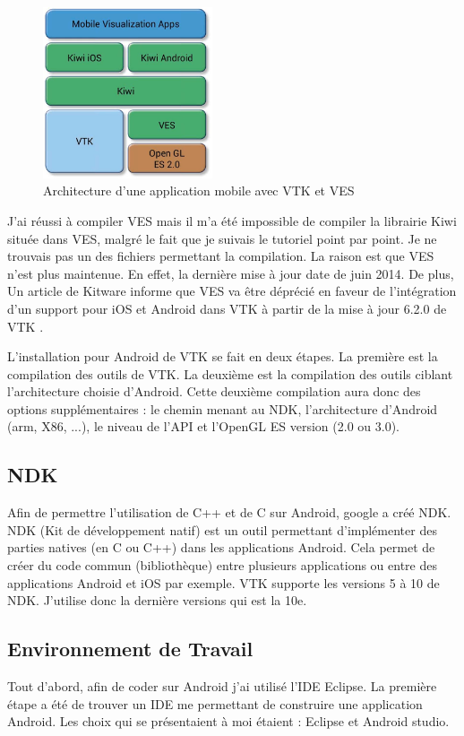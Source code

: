 \documentclass[a4paper,12pt]{article}
\begin{document}
\begin{figure}[h]
	\centering
	\includegraphics[width=5cm]{Kiwi.png} 
	\caption{Architecture d'une application mobile avec VTK et VES \cite{ndk538}}
	\label{kiwi}
\end{figure}


J'ai réussi à compiler VES mais il m'a été impossible de compiler la librairie Kiwi située dans VES, malgré le fait que je suivais le tutoriel point par point. Je ne trouvais pas un des fichiers permettant la compilation. La raison est que VES n'est plus maintenue. En effet, la dernière mise à jour date de juin 2014. De plus, Un article de Kitware informe que VES va \^etre déprécié en faveur de l'intégration d'un support pour iOS et Android dans VTK à partir de la mise à jour 6.2.0 de VTK \cite{ndk858, ndk860}.

L'installation pour Android de VTK se fait en deux étapes. La première est la compilation des outils de VTK. La deuxième est la compilation des outils ciblant l'architecture choisie d'Android. Cette deuxième compilation aura donc des options supplémentaires : le chemin menant au NDK, l'architecture d'Android (arm, X86, ...), le niveau de l'API et l'OpenGL ES version (2.0 ou 3.0).  

 	\subsection{NDK}
 Afin de permettre l'utilisation de C++ et de C sur Android, google a créé NDK. NDK (Kit de développement natif) est un outil permettant d'implémenter des parties natives (en C ou C++) dans les applications Android. Cela permet de créer du code commun (bibliothèque) entre plusieurs applications ou entre des applications Android et iOS par exemple\cite{ndk1}. VTK supporte les versions 5 à 10 de NDK. J'utilise donc la dernière versions qui est la 10e.
 
 \subsection{Environnement de Travail}
	Tout d'abord, afin de coder sur Android j'ai utilisé l'IDE Eclipse.  
 La première étape a été de trouver un IDE me permettant de construire une application Android. Les choix qui se présentaient à moi étaient : Eclipse et Android studio.
 
\end{document}
